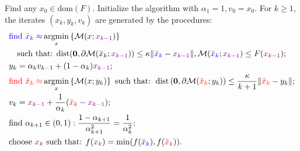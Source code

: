 \documentclass[12pt]{article}
\begin{document}
    \begin{definition}\label{def:basic-4wd-catalyst}
        Find any $x_0 \in \text{dom}(F)$. 
        Initialize the algorithm with $\alpha_1 = 1, v_0 = x_0$. 
        For $k \ge 1$, the iterates $(x_k, y_k, v_k)$ are generated by the procedures: 
        \vspace{-0.5em}
        \begin{align*}
            &
            \textcolor{blue}{
                \text{find } \bar x_k \approx 
            }
            \mathop{\rm argmin}\limits_{x}\left\lbrace
                    \mathcal M(x; \textcolor{violet}{x_{k - 1}})
                \right\rbrace
            \\ &\quad 
            \text{such that: }
                \text{dist}(\mathbf 0, \partial \mathcal M(\bar x_k; \textcolor{violet}{x_{k - 1}})) 
                \le 
                \kappa\Vert \textcolor{blue}{\bar x_k}- \textcolor{violet}{x_{k - 1}}\Vert, 
                \mathcal M(\textcolor{blue}{\bar x_k}; \textcolor{violet}{x_{k - 1}}) 
                \le F(\textcolor{violet}{x_{k - 1}}); 
            \\
            & y_k = \alpha_k v_{k - 1} + (1 - \alpha_k) \textcolor{violet}{x_{k - 1}};
            \\
            & 
            \textcolor{red}{\text{find }\tilde x_k \approx}
            \mathop{\rm argmin}\limits_{x} \left\lbrace
                \mathcal M(x; y_k) 
            \right\rbrace
            \text{ such that: }
                \operatorname{dist}\left(
                    \mathbf 0, \partial \mathcal M(\textcolor{red}{\tilde x_k}; y_k)
                \right) 
                \le \frac{\kappa}{k + 1}\Vert \textcolor{red}{\tilde x_k} - y_k\Vert
            ;
            \\
            & v_{k} = \textcolor{violet}{x_{k - 1}} + \frac{1}{\alpha_k}(
                    \textcolor{red}{\tilde x_k} - \textcolor{violet}{x_{k - 1}}
                );
            \\
            & 
            \text{find } \alpha_{k + 1} \in (0, 1): 
            \frac{1 - \alpha_{k + 1}}{\alpha_{k + 1}^2} = \frac{1}{\alpha_k^2};
            \\
            & \text{choose } \textcolor{violet}{x_k} \text{ such that:  } 
            f(\textcolor{violet}{x_k}) = \min(f(\textcolor{blue}{\bar x_k}), f(\textcolor{red}{\tilde x_k})). 
        \end{align*}
    \end{definition}
    
\end{document}
